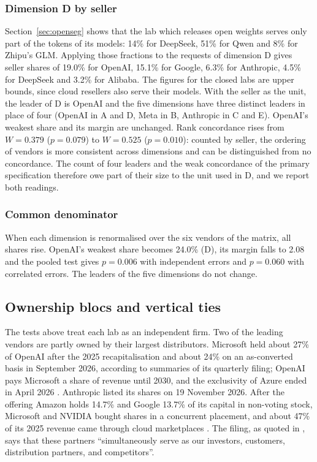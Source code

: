 \documentclass[11pt]{article}
\begin{document}
\subsubsection{Dimension D by seller} Section~\ref{sec:openseg} shows that the lab which releases open weights serves only part of the tokens of its models: 14\% for DeepSeek, 51\% for Qwen and 8\% for Zhipu's GLM. Applying those fractions to the requests of dimension D gives seller shares of 19.0\% for OpenAI, 15.1\% for Google, 6.3\% for Anthropic, 4.5\% for DeepSeek and 3.2\% for Alibaba. The figures for the closed labs are upper bounds, since cloud resellers also serve their models. With the seller as the unit, the leader of D is OpenAI and the five dimensions have three distinct leaders in place of four (OpenAI in A and D, Meta in B, Anthropic in C and E). OpenAI's weakest share and its margin are unchanged. Rank concordance rises from $W=0.379$ ($p=0.079$) to $W=0.525$ ($p=0.010$): counted by seller, the ordering of vendors is more consistent across dimensions and can be distinguished from no concordance. The count of four leaders and the weak concordance of the primary specification therefore owe part of their size to the unit used in D, and we report both readings.

\subsubsection{Common denominator} When each dimension is renormalised over the six vendors of the matrix, all shares rise. OpenAI's weakest share becomes 24.0\% (D), its margin falls to 2.08 and the pooled test gives $p=0.006$ with independent errors and $p=0.060$ with correlated errors. The leaders of the five dimensions do not change.

\subsection{Ownership blocs and vertical ties}
\label{sec:blocs}

The tests above treat each lab as an independent firm. Two of the leading vendors are partly owned by their largest distributors. Microsoft held about 27\% of OpenAI after the 2025 recapitalisation and about 24\% on an as-converted basis in September 2026, according to summaries of its quarterly filing; OpenAI pays Microsoft a share of revenue until 2030, and the exclusivity of Azure ended in April 2026 \cite{microsoft2026q1,cnbc2026openai}. Anthropic listed its shares on 19 November 2026. After the offering Amazon holds 14.7\% and Google 13.7\% of its capital in non-voting stock, Microsoft and NVIDIA bought shares in a concurrent placement, and about 47\% of its 2025 revenue came through cloud marketplaces \cite{fortune2026anthropic,csa2026frontier}. The filing, as quoted in \cite{fortune2026anthropic}, says that these partners ``simultaneously serve as our investors, customers, distribution partners, and competitors''.
\end{document}
